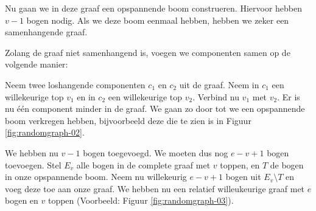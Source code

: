\documentclass{article}
\begin{document}
Nu gaan we in deze graaf een opspannende boom construeren. Hiervoor hebben
$v - 1$ bogen nodig. Als we deze boom eenmaal hebben, hebben we zeker een
samenhangende graaf. 
\newline

Zolang de graaf niet samenhangend is, voegen we componenten samen op de volgende
manier:
\newline

Neem twee loshangende componenten $c_1$ en $c_2$ uit de graaf. Neem in $c_1$ een
willekeurige top $v_1$ en in $c_2$ een willekeurige top $v_2$. Verbind nu $v_1$
met $v_2$. Er is nu \'e\'en component minder in de graaf. We gaan zo door tot
we een opspannende boom verkregen hebben, bijvoorbeeld deze die te zien is in
Figuur \ref{fig:randomgraph-02}.

We hebben nu $v - 1$ bogen toegevoegd. We moeten dus nog $e - v + 1$ bogen
toevoegen. Stel $E_v$ alle bogen in de complete graaf met $v$ toppen, en $T$ de
bogen in onze opspannende boom. Neem nu willekeurig $e - v + 1$ bogen uit
$E_v \setminus T$ en voeg deze toe aan onze graaf. We hebben nu een relatief
willeukeurige graaf met $e$ bogen en $v$ toppen (Voorbeeld: Figuur
\ref{fig:randomgraph-03}).
\end{document}
